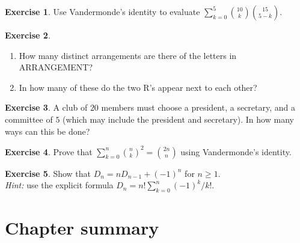 \documentclass[12pt,a4paper,openany]{book}
\theoremstyle{definition}
\newtheorem{exercise}{Exercise}[chapter]
\theoremstyle{plain}
\theoremstyle{remark}
\begin{document}
\begin{exercise}\label{exer:vandermonde-application}
Use Vandermonde's identity to evaluate
$\displaystyle\sum_{k=0}^{5}\binom{10}{k}\binom{15}{5-k}$.
\end{exercise}

\begin{exercise}\label{exer:multinomial}
\begin{enumerate}[label=(\alph*)]
  \item How many distinct arrangements are there of the letters in
        \textsc{ARRANGEMENT}?
  \item In how many of these do the two R's appear next to each other?
\end{enumerate}
\end{exercise}

\begin{exercise}\label{exer:committee-president}
A club of $20$ members must choose a president, a secretary, and a committee
of $5$ (which may include the president and secretary). In how many ways can
this be done?
\end{exercise}

\begin{exercise}\label{exer:diagonal-sum}
Prove that $\displaystyle\sum_{k=0}^{n}\binom{n}{k}^2 = \binom{2n}{n}$
using Vandermonde's identity.
\end{exercise}

\begin{exercise}\label{exer:derangement-subfactorial}
Show that $D_n = nD_{n-1} + (-1)^n$ for $n \geq 1$.\\
\emph{Hint:} use the explicit formula
$D_n = n!\sum_{k=0}^{n}(-1)^k/k!$.
\end{exercise}

\section{Chapter summary}
\label{sec:ch4-summary}
\end{document}
